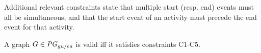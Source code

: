Additional relevant constraints state that multiple start (resp. end) events must all be simultaneous, and that the start event of an activity must precede the end event for that activity.
\\

\begin{definition}[Validity]
 A graph $G \in \mathit{PG}_{gu/ea}$ is valid iff it satisfies constraints C1-C5.
	\label{def:valid-guea}
\end{definition}

